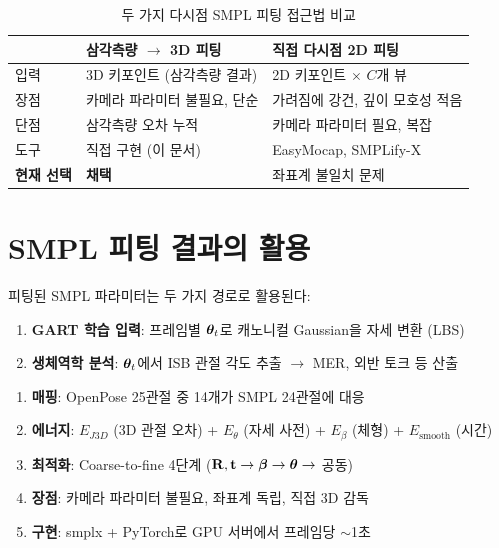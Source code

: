 \documentclass[11pt, a4paper]{report}
\begin{document}
\begin{table}[H]
\centering
\caption{두 가지 다시점 SMPL 피팅 접근법 비교}
\renewcommand{\arraystretch}{1.3}
\begin{tabularx}{\textwidth}{lXX}
\toprule
& \textbf{삼각측량 $\rightarrow$ 3D 피팅} & \textbf{직접 다시점 2D 피팅} \\
\midrule
입력 & 3D 키포인트 (삼각측량 결과) & 2D 키포인트 $\times$ $C$개 뷰 \\
장점 & 카메라 파라미터 불필요, 단순 & 가려짐에 강건, 깊이 모호성 적음 \\
단점 & 삼각측량 오차 누적 & 카메라 파라미터 필요, 복잡 \\
도구 & 직접 구현 (이 문서) & EasyMocap, SMPLify-X \\
\textbf{현재 선택} & \textcolor{thmgreen}{\textbf{채택}} & 좌표계 불일치 문제 \\
\bottomrule
\end{tabularx}
\end{table}


\section{SMPL 피팅 결과의 활용}

피팅된 SMPL 파라미터는 두 가지 경로로 활용된다:

\begin{enumerate}[leftmargin=*]
  \item \textbf{GART 학습 입력}: 프레임별 $\bm{\theta}_t$로 캐노니컬 Gaussian을 자세 변환 (LBS)
  \item \textbf{생체역학 분석}: $\bm{\theta}_t$에서 ISB 관절 각도 추출 $\rightarrow$ MER, 외반 토크 등 산출
\end{enumerate}

\begin{summary}[title={OpenPose 3D $\rightarrow$ SMPL 피팅 핵심 요약}]
\begin{enumerate}[nosep]
  \item \textbf{매핑}: OpenPose 25관절 중 14개가 SMPL 24관절에 대응
  \item \textbf{에너지}: $E_{J3D}$ (3D 관절 오차) + $E_\theta$ (자세 사전) + $E_\beta$ (체형) + $E_{\text{smooth}}$ (시간)
  \item \textbf{최적화}: Coarse-to-fine 4단계 ($\mathbf{R},\mathbf{t} \rightarrow \bm{\beta} \rightarrow \bm{\theta} \rightarrow$ 공동)
  \item \textbf{장점}: 카메라 파라미터 불필요, 좌표계 독립, 직접 3D 감독
  \item \textbf{구현}: smplx + PyTorch로 GPU 서버에서 프레임당 $\sim$1초
\end{enumerate}
\end{summary}
\end{document}

